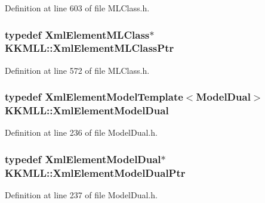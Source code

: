 Definition at line 603 of file M\+L\+Class.\+h.

\subsubsection[{\texorpdfstring{Xml\+Element\+M\+L\+Class\+Ptr}{XmlElementMLClassPtr}}]{\setlength{\rightskip}{0pt plus 5cm}typedef {\bf Xml\+Element\+M\+L\+Class}$\ast$ {\bf K\+K\+M\+L\+L\+::\+Xml\+Element\+M\+L\+Class\+Ptr}}\hypertarget{namespace_k_k_m_l_l_a0769bf71221e9eef1e7847bd442b9152}{}\label{namespace_k_k_m_l_l_a0769bf71221e9eef1e7847bd442b9152}


Definition at line 572 of file M\+L\+Class.\+h.

\subsubsection[{\texorpdfstring{Xml\+Element\+Model\+Dual}{XmlElementModelDual}}]{\setlength{\rightskip}{0pt plus 5cm}typedef {\bf Xml\+Element\+Model\+Template}$<${\bf Model\+Dual}$>$ {\bf K\+K\+M\+L\+L\+::\+Xml\+Element\+Model\+Dual}}\hypertarget{namespace_k_k_m_l_l_a1c925e099b1aba977b8a758b1310a815}{}\label{namespace_k_k_m_l_l_a1c925e099b1aba977b8a758b1310a815}


Definition at line 236 of file Model\+Dual.\+h.

\subsubsection[{\texorpdfstring{Xml\+Element\+Model\+Dual\+Ptr}{XmlElementModelDualPtr}}]{\setlength{\rightskip}{0pt plus 5cm}typedef {\bf Xml\+Element\+Model\+Dual}$\ast$ {\bf K\+K\+M\+L\+L\+::\+Xml\+Element\+Model\+Dual\+Ptr}}\hypertarget{namespace_k_k_m_l_l_a87b60bb5da92107842fd1d620ab224fd}{}\label{namespace_k_k_m_l_l_a87b60bb5da92107842fd1d620ab224fd}


Definition at line 237 of file Model\+Dual.\+h.

